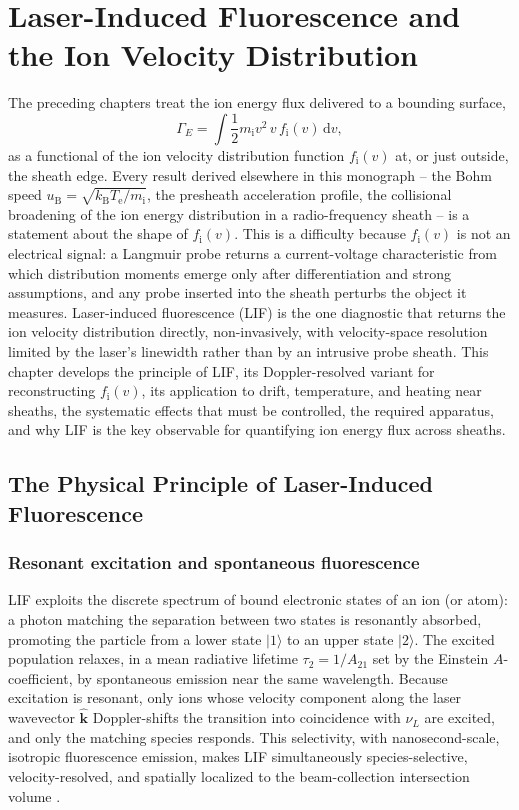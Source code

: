 \chapter{Laser-Induced Fluorescence and the Ion Velocity Distribution}
\label{ch:lif}

The preceding chapters treat the ion energy flux delivered to a bounding surface,
\begin{equation}
\Gamma_{E} = \int \frac{1}{2} m_{\mathrm{i}} v^{2}\, v\, f_{\mathrm{i}}(v)\, \mathrm{d}v ,
\label{eq:lif-gammaE-def}
\end{equation}
as a functional of the ion velocity distribution function $f_{\mathrm{i}}(v)$ at, or just outside, the sheath edge. Every result derived elsewhere in this monograph -- the Bohm speed $u_{\mathrm{B}} = \sqrt{k_{\mathrm{B}} T_{\mathrm{e}}/m_{\mathrm{i}}}$, the presheath acceleration profile, the collisional broadening of the ion energy distribution in a radio-frequency sheath -- is a statement about the shape of $f_{\mathrm{i}}(v)$. This is a difficulty because $f_{\mathrm{i}}(v)$ is not an electrical signal: a Langmuir probe returns a current-voltage characteristic from which distribution moments emerge only after differentiation and strong assumptions, and any probe inserted into the sheath perturbs the object it measures. Laser-induced fluorescence (LIF) is the one diagnostic that returns the ion velocity distribution directly, non-invasively, with velocity-space resolution limited by the laser's linewidth rather than by an intrusive probe sheath. This chapter develops the principle of LIF, its Doppler-resolved variant for reconstructing $f_{\mathrm{i}}(v)$, its application to drift, temperature, and heating near sheaths, the systematic effects that must be controlled, the required apparatus, and why LIF is the key observable for quantifying ion energy flux across sheaths.

\section{The Physical Principle of Laser-Induced Fluorescence}

\subsection{Resonant excitation and spontaneous fluorescence}

LIF exploits the discrete spectrum of bound electronic states of an ion (or atom): a photon matching the separation between two states is resonantly absorbed, promoting the particle from a lower state $\lvert 1 \rangle$ to an upper state $\lvert 2 \rangle$. The excited population relaxes, in a mean radiative lifetime $\tau_{2} = 1/A_{21}$ set by the Einstein $A$-coefficient, by spontaneous emission near the same wavelength. Because excitation is resonant, only ions whose velocity component along the laser wavevector $\hat{\mathbf{k}}$ Doppler-shifts the transition into coincidence with $\nu_{L}$ are excited, and only the matching species responds. This selectivity, with nanosecond-scale, isotropic fluorescence emission, makes LIF simultaneously species-selective, velocity-resolved, and spatially localized to the beam-collection intersection volume \cite{ref0300,ref0292}.

